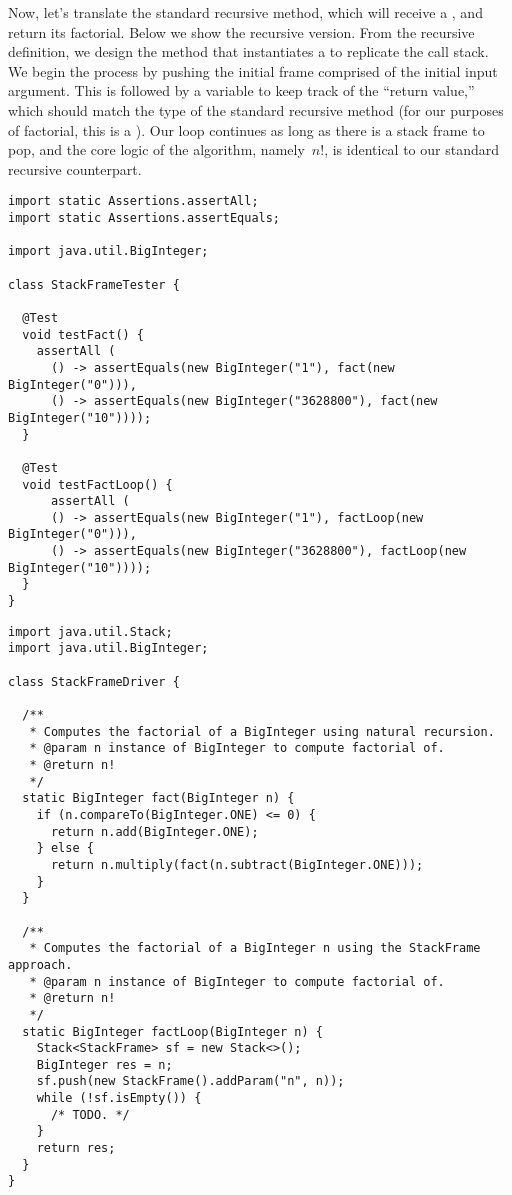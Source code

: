 Now, let's translate the standard recursive  method, which will receive a , and return its factorial. 
Below we show the recursive version. 
From the recursive definition, we design the  method that instantiates a  to replicate the call stack. 
We begin the process by pushing the initial frame comprised of the initial input argument. 
This is followed by a variable to keep track of the ``return value,'' which should match the type of the standard recursive method (for our purposes of factorial, this is a ). 
Our loop continues as long as there is a stack frame to pop, and the core logic of the algorithm, namely~$n!$, is identical to our standard recursive counterpart.

\begin{lstlisting}[language=MyJava]
import static Assertions.assertAll;
import static Assertions.assertEquals;

import java.util.BigInteger;

class StackFrameTester {

  @Test
  void testFact() {
    assertAll (
      () -> assertEquals(new BigInteger("1"), fact(new BigInteger("0"))),
      () -> assertEquals(new BigInteger("3628800"), fact(new BigInteger("10"))));
  }

  @Test
  void testFactLoop() {
      assertAll (
      () -> assertEquals(new BigInteger("1"), factLoop(new BigInteger("0"))),
      () -> assertEquals(new BigInteger("3628800"), factLoop(new BigInteger("10"))));
  }
}  
\end{lstlisting}

\begin{lstlisting}[language=MyJava]
import java.util.Stack;
import java.util.BigInteger;

class StackFrameDriver {

  /**
   * Computes the factorial of a BigInteger using natural recursion.
   * @param n instance of BigInteger to compute factorial of.
   * @return n!
   */
  static BigInteger fact(BigInteger n) {
    if (n.compareTo(BigInteger.ONE) <= 0) {
      return n.add(BigInteger.ONE);
    } else {
      return n.multiply(fact(n.subtract(BigInteger.ONE)));
    }
  }

  /**
   * Computes the factorial of a BigInteger n using the StackFrame approach.
   * @param n instance of BigInteger to compute factorial of.
   * @return n!
   */
  static BigInteger factLoop(BigInteger n) {
    Stack<StackFrame> sf = new Stack<>();
    BigInteger res = n;
    sf.push(new StackFrame().addParam("n", n));
    while (!sf.isEmpty()) { 
      /* TODO. */ 
    }
    return res;
  }
}
\end{lstlisting}

